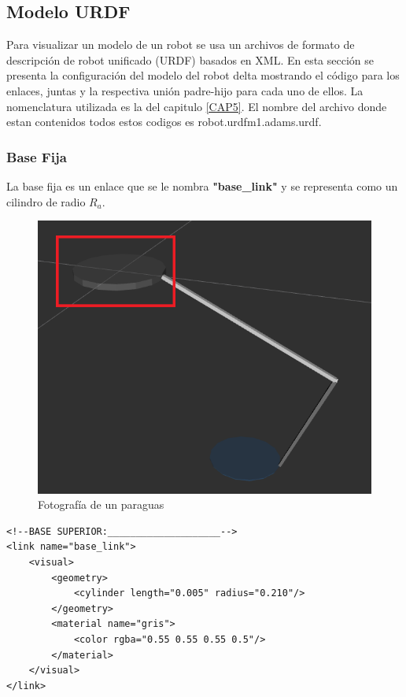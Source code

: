     \newpage
       
       
       
    \subsection{Modelo URDF}
        Para visualizar un modelo de un robot se usa un archivos de formato de descripción de robot unificado (URDF) basados en XML. En esta sección se presenta la configuración del modelo del robot delta mostrando el código para los enlaces, juntas y la respectiva unión padre-hijo para cada uno de ellos. La nomenclatura utilizada es la del capitulo \ref{CAP5}. El nombre del archivo donde estan contenidos todos estos codigos es robot.urdfm1.adams.urdf.  
        
       \subsubsection{Base Fija}
        La base fija es un enlace que se le nombra \textbf{"base\_link"} y se representa como un cilindro de radio \textbf{$R_a$}.

             \begin{figure}[h]
                \centering
                \includegraphics[width=0.6\linewidth]{Main/Chapter6/Images6/cap6_basefija.png}
                \caption{Fotografía de un paraguas}
                \label{f:Cap6_urdf_1}
            \end{figure}  


        \lstset{language=XML}
        \begin{lstlisting}
<!--BASE SUPERIOR:____________________-->
<link name="base_link">
	<visual>
		<geometry>
			<cylinder length="0.005" radius="0.210"/> 
		</geometry>
		<material name="gris">
			<color rgba="0.55 0.55 0.55 0.5"/>
		</material>
	</visual>
</link>
        \end{lstlisting}

